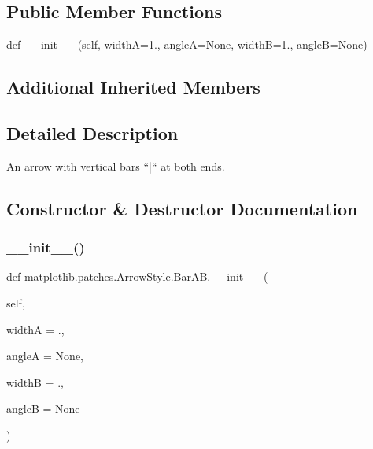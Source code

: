 \subsection*{Public Member Functions}
\begin{DoxyCompactItemize}
\item 
def \hyperlink{classmatplotlib_1_1patches_1_1ArrowStyle_1_1BarAB_a4852ef2a85c16212702efce86413deab}{\+\_\+\+\_\+init\+\_\+\+\_\+} (self, widthA=1., angleA=None, \hyperlink{classmatplotlib_1_1patches_1_1ArrowStyle_1_1__Bracket_a145f84316adeeaabbe60a5dea2281ddf}{widthB}=1., \hyperlink{classmatplotlib_1_1patches_1_1ArrowStyle_1_1__Bracket_ad57a9e23886fca6b0e6c632a509d947d}{angleB}=None)
\end{DoxyCompactItemize}
\subsection*{Additional Inherited Members}


\subsection{Detailed Description}
\begin{DoxyVerb}An arrow with vertical bars ``|`` at both ends.\end{DoxyVerb}
 

\subsection{Constructor \& Destructor Documentation}
\mbox{\label{classmatplotlib_1_1patches_1_1ArrowStyle_1_1BarAB_a4852ef2a85c16212702efce86413deab}} 
\subsubsection{\texorpdfstring{\+\_\+\+\_\+init\+\_\+\+\_\+()}{\_\_init\_\_()}}
{\footnotesize\ttfamily def matplotlib.\+patches.\+Arrow\+Style.\+Bar\+A\+B.\+\_\+\+\_\+init\+\_\+\+\_\+ (\begin{DoxyParamCaption}\item[{}]{self,  }\item[{}]{widthA = {.},  }\item[{}]{angleA = {\ttfamily None},  }\item[{}]{widthB = {.},  }\item[{}]{angleB = {\ttfamily None} }\end{DoxyParamCaption})}

